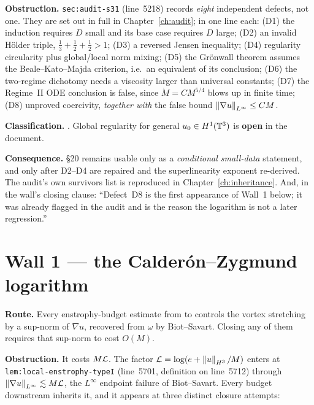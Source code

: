\textbf{Obstruction.} \texttt{sec:audit-s31} (line~5218) records \emph{eight}
independent defects, not one. They are set out in full in
Chapter~\ref{ch:audit}; in one line each: (D1) the induction requires \(D\)
small and its base case requires \(D\) large; (D2) an invalid H\"older triple,
\(\tfrac13+\tfrac12+\tfrac12>1\); (D3) a reversed Jensen inequality; (D4)
regularity circularity plus global/local norm mixing; (D5) the Gr\"onwall
theorem assumes the Beale--Kato--Majda criterion, i.e.\ an equivalent of its
conclusion; (D6) the two-regime dichotomy needs a viscosity larger than
universal constants; (D7) the Regime~II ODE conclusion is false, since
\(\dot M=CM^{5/4}\) blows up in finite time; (D8) unproved coercivity,
\emph{together with} the false bound \(\left\|\nabla u\right\|_{L^\infty}\le CM\).

\textbf{Classification.} \WITHDRAWN{}. Global regularity for general
\(u_0\in H^1(\mathbb{T}^3)\) is \textbf{open} in the document.

\textbf{Consequence.} \S20 remains usable only as a \emph{conditional
small-data} statement, and only after D2--D4 are repaired and the
superlinearity exponent re-derived. The audit's own survivors list is
reproduced in Chapter~\ref{ch:inheritance}. And, in the wall's closing clause:
``Defect~D8 is the first appearance of Wall~1 below; it was already flagged in
the audit and is the reason the logarithm is not a later regression.''

\section{Wall 1 --- the Calder\'on--Zygmund logarithm}
\label{sec:wall1}

\textbf{Route.} Every enstrophy-budget estimate from  to 
controls the vortex stretching by a sup-norm of \(\nabla u\), recovered from
\(\omega\) by Biot--Savart. Closing any of them requires that sup-norm to cost
\(O(M)\).

\textbf{Obstruction.} It costs \(M\mathcal{L}\). The factor
\(\mathcal{L}=\log(e+\left\|u\right\|_{H^3}/M)\) enters at
\texttt{lem:local-enstrophy-typeI} (line~5701, definition on line~5712)
through \(\left\|\nabla u\right\|_{L^\infty}\lesssim M\mathcal{L}\), the \(L^\infty\)
endpoint failure of Biot--Savart. Every budget downstream inherits it, and it
appears at three distinct closure attempts:

